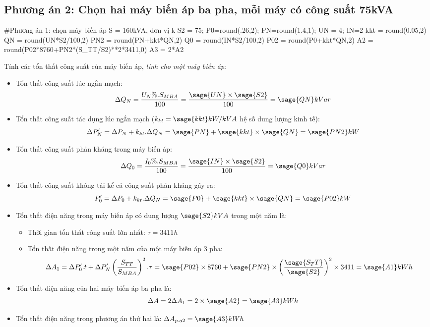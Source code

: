 \documentclass[12pt,a4paper]{article}
\begin{document}
\subsection{Phương án 2: Chọn hai máy biến áp ba pha, mỗi máy có công suất 75kVA}
\begin{sagesilent}
#Phương án 1: chọn máy biến áp S = 160kVA, đơn vị k
S2 = 75; P0=round(.26,2); PN=round(1.4,1); UN = 4; IN=2
kkt = round(0.05,2)
QN = round(UN*S2/100,2)
PN2 = round(PN+kkt*QN,2)
Q0 = round(IN*S2/100,2)
P02 = round(P0+kkt*QN,2)
A2 = round(P02*8760+PN2*(S_TT/S2)**2*3411,0)
A3 = 2*A2
\end{sagesilent}
\hspace{.6cm}Tính các tổn thất công suất của máy biến áp, \emph{tính cho một máy biến áp}:
\begin{itemize}
\item Tổn thất công suất lúc ngắn mạch: $$ \Delta Q_N = \frac{U_N\%.S_{MBA}}{100}=\frac{\sage{UN}\times\sage{S2}}{100} = \sage{QN}kVar$$
\item Tổn thất công suất tác dụng lúc ngắn mạch ($k_{kt} = \sage{kkt} kW/kVA$ hệ số dung lượng kinh tế):$$ \Delta P_N^\prime = \Delta P_N + k_{kt}.\Delta Q_N = \sage{PN}+\sage{kkt}\times\sage{QN}=\sage{PN2}kW$$
\item Tổn thất công suất phản kháng trong máy biến áp: $$ \Delta Q_0 = \frac{I_0\%.S_{MBA}}{100}=\frac{\sage{IN}\times\sage{S2}}{100} = \sage{Q0}kVar$$
\item Tổn thất công suất không tải kể cả công suất phản kháng gây ra:$$ P_0^\prime = \Delta P_0 + k_{kt}.\Delta Q_N = \sage{P0}+\sage{kkt}\times\sage{QN}=\sage{P02}kW$$
\item Tổn thất điện năng trong máy biến áp có dung lượng $\sage{S2}kVA$ trong một năm là: 
\begin{itemize}
\item Thời gian tổn thất công suất lớn nhất: $\tau = 3411h$
\item Tổn thất điện năng trong một năm của một máy biến áp 3 pha: $$\Delta A_1 = \Delta P_0^\prime .t + \Delta P_N^\prime \left({\frac{S_{TT}}{S_{MBA}}}\right)^2.\tau=\sage{P02} \times 8760+\sage{PN2} \times \left({\frac{\sage{S_TT}}{\sage{S2}}}\right)^2\times 3411=\sage{A1}kWh$$
\end{itemize}
\item Tổn thất điện năng của hai máy biến áp ba pha là: $$\Delta A = 2\Delta A_1 = 2\times \sage{A2} = \sage{A3} kWh$$
\item Tổn thất điện năng trong phương án thứ hai là: $\Delta A_{p.a2}=\sage{A3}kWh$
\end{itemize}
\end{document}
